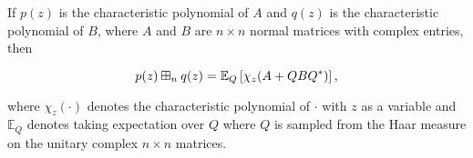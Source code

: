 \begin{theorem} \label{thm:symmad}
    If $p(z)$ is the characteristic polynomial of $A$ and $q(z)$ is the characteristic polynomial of $B$, where $A$ and $B$ are $n\times n$ normal matrices with complex entries, then 

    \begin{equation*}
        p(z) \boxplus_n q(z) = \mathbb E_Q\left[\chi_z(A + Q B Q^*)\right],
    \end{equation*}

    \noindent where $\chi_z(\cdot)$ denotes the characteristic polynomial of $\cdot$ with $z$ as a variable and $\mathbb E_Q$ denotes taking expectation over $Q$ where $Q$ is sampled from the Haar measure on the unitary complex $n\times n$ matrices.
\end{theorem}





